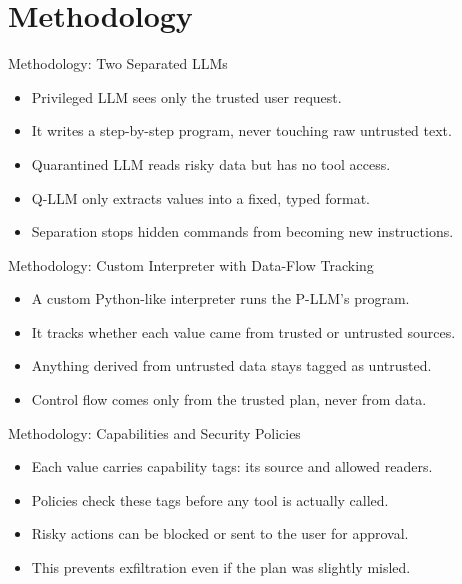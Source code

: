 \documentclass[10pt]{beamer}
\begin{document}
\section{Methodology}
\begin{frame}[allowframebreaks]{Methodology: Two Separated LLMs}
\begin{itemize}
  \item Privileged LLM sees only the trusted user request.
  \item It writes a step-by-step program, never touching raw untrusted text.
  \item Quarantined LLM reads risky data but has no tool access.
  \item Q-LLM only extracts values into a fixed, typed format.
  \item Separation stops hidden commands from becoming new instructions.
\end{itemize}
\end{frame}
\begin{frame}[allowframebreaks]{Methodology: Custom Interpreter with Data-Flow Tracking}
\begin{itemize}
  \item A custom Python-like interpreter runs the P-LLM's program.
  \item It tracks whether each value came from trusted or untrusted sources.
  \item Anything derived from untrusted data stays tagged as untrusted.
  \item Control flow comes only from the trusted plan, never from data.
\end{itemize}
\end{frame}
\begin{frame}[allowframebreaks]{Methodology: Capabilities and Security Policies}
\begin{itemize}
  \item Each value carries capability tags: its source and allowed readers.
  \item Policies check these tags before any tool is actually called.
  \item Risky actions can be blocked or sent to the user for approval.
  \item This prevents exfiltration even if the plan was slightly misled.
\end{itemize}
\end{frame}
\end{document}
